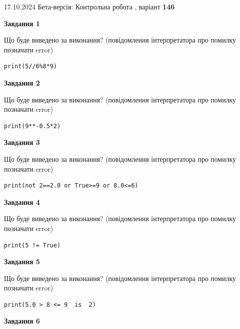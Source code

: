 \documentclass[12pt, ukrainian]{article}
\begin{document}
{\Large{17.10.2024 Бета-версія: Контрольна робота , варіант  \No \textbf { 146 }\par}}
{
\begin {large}
{\begin {center}\textbf{Завдання 1}\end {center}}

Що буде виведено за виконання? (повідомлення інтерпретатора про помилку позначати error)\par
\begin{verbatim}
print(5//6%8*9)
\end{verbatim}

{\begin {center}\textbf{Завдання 2}\end {center}}

Що буде виведено за виконання? (повідомлення інтерпретатора про помилку позначати error)\par
\begin{verbatim}
print(9**-0.5*2)
\end{verbatim}

{\begin {center}\textbf{Завдання 3}\end {center}}

Що буде виведено за виконання? (повідомлення інтерпретатора про помилку позначати error)\par
\begin{verbatim}
print(not 2==2.0 or True>=9 or 8.0<=6)
\end{verbatim}

{\begin {center}\textbf{Завдання 4}\end {center}}

Що буде виведено за виконання? (повідомлення інтерпретатора про помилку позначати error)\par
\begin{verbatim}
print(5 != True)
\end{verbatim}

{\begin {center}\textbf{Завдання 5}\end {center}}

Що буде виведено за виконання? (повідомлення інтерпретатора про помилку позначати error)\par
\begin{verbatim}
print(5.0 > 8 <= 9  is  2)
\end{verbatim}

{\begin {center}\textbf{Завдання 6}\end {center}}


\end{large}}
\end{document}

